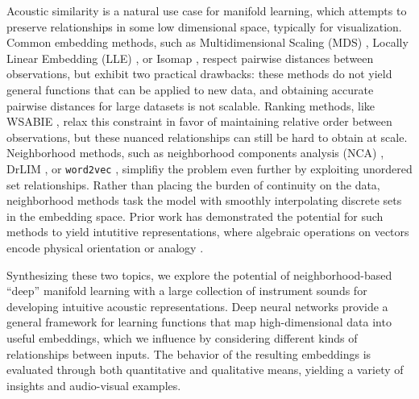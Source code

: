 \documentclass{article}
\begin{document}
Acoustic similarity is a natural use case for manifold learning, which attempts to preserve relationships in some low dimensional space, typically for visualization.
Common embedding methods, such as Multidimensional Scaling (MDS) \cite{borg2005mds}, Locally Linear Embedding (LLE) \cite{roweis2000nonlinear}, or Isomap \cite{tenenbaum2000global}, respect pairwise distances between observations, but exhibit two practical drawbacks:
these methods do not yield general functions that can be applied to new data, and obtaining accurate pairwise distances for large datasets is not scalable.
Ranking methods, like WSABIE \cite{weston2011wsabie}, relax this constraint in favor of maintaining relative order between observations, but these nuanced relationships can still be hard to obtain at scale.
Neighborhood methods, such as neighborhood components analysis (NCA) \cite{goldberger2004neighbourhood, salakhutdinov2007learning}, DrLIM \cite{hadsell2006dimensionality}, or \texttt{word2vec} \cite{mikolov2013distributed}, simplifiy the problem even further by exploiting unordered set relationships. %
Rather than placing the burden of continuity on the data, neighborhood methods task the model with smoothly interpolating discrete sets in the embedding space.
Prior work has demonstrated the potential for such methods to yield intutitive representations, where algebraic operations on vectors encode physical orientation \cite{hadsell2006dimensionality} or analogy \cite{mikolov2013efficient}.

Synthesizing these two topics, we explore the potential of neighborhood-based ``deep'' manifold learning with a large collection of instrument sounds for developing intuitive acoustic representations.
Deep neural networks provide a general framework for learning functions that map high-dimensional data into useful embeddings, which we influence by considering different kinds of relationships between inputs.
The behavior of the resulting embeddings is evaluated through both quantitative and qualitative means, yielding a variety of insights and audio-visual examples.
\end{document}
